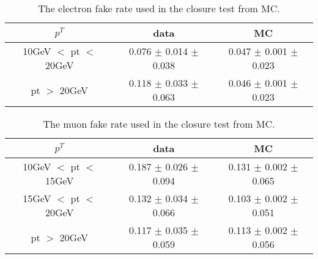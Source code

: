 \begin{table}[!htb]
\caption{
\label{tab:ct_fr_el}
The electron fake rate used in the closure test from MC.
}
\begin{center}
\begin{tabular}{|c|c|c|}
\hline
  $p^{T}$               &                  data                   &                  MC       \\
\hline\hline
10GeV $<$ pt $<$ 20GeV  &    0.076 $\pm$ 0.014 $\pm$ 0.038       &     0.047 $\pm$ 0.001 $\pm$ 0.023  \\
 pt $>$  20GeV          &    0.118 $\pm$ 0.033 $\pm$ 0.063       &     0.046 $\pm$ 0.001 $\pm$ 0.023   \\
\hline
\hline
\end{tabular}
\end{center}
\end{table}

\begin{table}[!htb]
\caption{
\label{tab:ct_fr_mu}
The muon fake rate used in the closure test from MC.
}
\begin{center}
\begin{tabular}{|c|c|c|}
\hline
  $p^{T}$               &                  data                   &                  MC       \\
\hline\hline
10GeV $<$ pt $<$ 15GeV  &    0.187 $\pm$ 0.026 $\pm$ 0.094      &     0.131 $\pm$ 0.002 $\pm$ 0.065  \\
15GeV $<$ pt $<$ 20GeV  &    0.132 $\pm$ 0.034 $\pm$ 0.066      &     0.103 $\pm$ 0.002 $\pm$ 0.051   \\
 pt $>$  20GeV          &    0.117 $\pm$ 0.035 $\pm$ 0.059      &     0.113 $\pm$ 0.002 $\pm$ 0.056   \\
\hline
\hline
\end{tabular}
\end{center}
\end{table}


